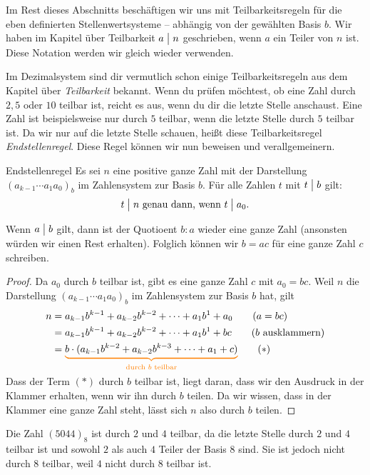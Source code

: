 \documentclass[../../main.tex]{subfiles}
\begin{document}
Im Rest dieses Abschnitts beschäftigen wir uns mit Teilbarkeitsregeln für die eben definierten Stellenwertsysteme --
abhängig von der gewählten Basis $b$. Wir haben im Kapitel über Teilbarkeit $a\divides n$ geschrieben, wenn $a$ ein
Teiler von $n$ ist. Diese Notation werden wir gleich wieder verwenden.

Im Dezimalsystem sind dir vermutlich schon einige Teilbarkeitsregeln aus dem Kapitel über \mayberef\emph{Teilbarkeit}
bekannt. Wenn du prüfen möchtest, ob eine Zahl durch $2, 5$ oder $10$ teilbar ist, reicht es aus, wenn du dir die letzte
Stelle anschaust. Eine Zahl ist beispielsweise nur durch $5$ teilbar, wenn die letzte Stelle durch $5$ teilbar ist. Da
wir nur auf die letzte Stelle schauen, heißt diese Teilbarkeitsregel \emph{Endstellenregel}. Diese Regel können wir nun
beweisen und verallgemeinern.
\begin{theorem}{Endstellenregel}
    Es sei $n$ eine positive ganze Zahl mit der Darstellung $(a_{k-1}\cdots a_1a_0)_b$ im Zahlensystem zur Basis $b$.
    Für alle Zahlen $t$ mit $t\divides b$ gilt:
    \[t\divides n\text{ genau dann, wenn }t\divides a_0.\]
\end{theorem}
Wenn $a\divides b$ gilt, dann ist der Quotioent $b:a$ wieder eine ganze Zahl (ansonsten würden wir einen Rest erhalten).
Folglich können wir $b=ac$ für eine ganze Zahl $c$ schreiben. 
\begin{proof}
    Da $a_0$ durch $b$ teilbar ist, gibt es eine ganze Zahl $c$ mit $a_0=bc$. Weil $n$ die Darstellung
    $(a_{k-1}\cdots a_1a_0)_b$ im Zahlensystem zur Basis $b$ hat, gilt
    \begin{align*}
        n&=a_{k-1}b^{k-1}+a_{k-2}b^{k-2}+\dots+a_1b^1+a_0\tag{$a=bc$}\\
        &=a_{k-1}b^{k-1}+a_{k-2}b^{k-2}+\dots+a_1b^1+bc\tag{$b$ ausklammern}\\
        &=\colorbrace{b\cdot(a_{k-1}b^{k-2}+a_{k-2}b^{k-3}+\dots+a_1+c)}{\text{durch }b\text{ teilbar}}\tag{$*$}
    \end{align*}
    Dass der Term $(*)$ durch $b$ teilbar ist, liegt daran, dass wir den Ausdruck in der Klammer erhalten, wenn wir ihn
    durch $b$ teilen. Da wir wissen, dass in der Klammer eine ganze Zahl steht, lässt sich $n$ also durch $b$ teilen.
\end{proof}
\begin{example}{}
    Die Zahl $(5044)_8$ ist durch $2$ und $4$ teilbar, da die letzte Stelle durch $2$ und $4$ teilbar ist und sowohl $2$
    als auch $4$ Teiler der Basis $8$ sind. Sie ist jedoch nicht durch $8$ teilbar, weil $4$ nicht durch $8$ teilbar ist.
\end{example}
\end{document}
